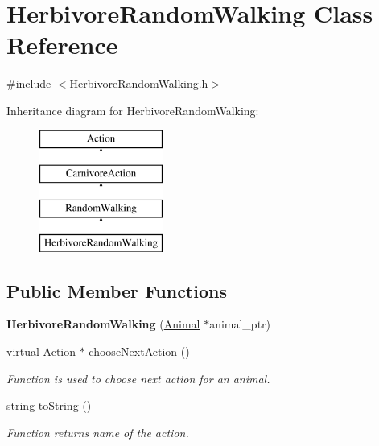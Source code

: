 \hypertarget{class_herbivore_random_walking}{}\section{Herbivore\+Random\+Walking Class Reference}
\label{class_herbivore_random_walking}


{\ttfamily \#include $<$Herbivore\+Random\+Walking.\+h$>$}

Inheritance diagram for Herbivore\+Random\+Walking\+:\begin{figure}[H]
\begin{center}
\leavevmode
\includegraphics[height=4.000000cm]{class_herbivore_random_walking}
\end{center}
\end{figure}
\subsection*{Public Member Functions}
\begin{DoxyCompactItemize}
\item 
\hypertarget{class_herbivore_random_walking_afefda07f0ba064504e2632e61e878688}{}{\bfseries Herbivore\+Random\+Walking} (\hyperlink{class_animal}{Animal} $\ast$animal\+\_\+ptr)\label{class_herbivore_random_walking_afefda07f0ba064504e2632e61e878688}

\item 
virtual \hyperlink{class_action}{Action} $\ast$ \hyperlink{class_herbivore_random_walking_aabb756e01d8d8a7f92ecaef6128a4a2c}{choose\+Next\+Action} ()
\begin{DoxyCompactList}\small\item\em Function is used to choose next action for an animal. \end{DoxyCompactList}\item 
string \hyperlink{class_herbivore_random_walking_a27a17f1ee3d5df3103f3348523c4801a}{to\+String} ()
\begin{DoxyCompactList}\small\item\em Function returns name of the action. \end{DoxyCompactList}\end{DoxyCompactItemize}

